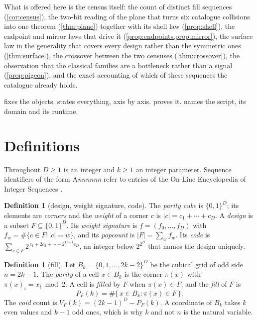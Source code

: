 \documentclass[11pt]{amsart}
\theoremstyle{definition}
\newtheorem{definition}[theorem]{Definition}
\theoremstyle{remark}
\begin{document}
What is offered here is the census itself: the count of distinct fill sequences (\cref{cor:census}), the two-bit reading of the plane that turns six catalogue collisions into one theorem (\cref{thm:plane}) together with its shell law (\cref{prop:shell}), the endpoint and mirror laws that drive it (\cref{prop:endpoints,prop:mirror}), the surface law in the generality that covers every design rather than the symmetric ones (\cref{thm:surface}), the crossover between the two censuses (\cref{thm:crossover}), the observation that the classical families are a bottleneck rather than a signal (\cref{prop:pigeon}), and the exact accounting of which of these sequences the catalogue already holds.

 fixes the objects.  states everything, axis by axis.  proves it.  names the script, its domain and its runtime.

\section{Definitions}
\label{sec:def}

Throughout $D \ge 1$ is an integer and $k \ge 1$ an integer parameter. Sequence identifiers of the form A\textit{nnnnnn} refer to entries of the On-Line Encyclopedia of Integer Sequences \cite{oeis}.

\begin{definition}[design, weight signature, code]
\label{def:design}
The \emph{parity cube} is $\{0,1\}^{D}$; its elements are \emph{corners} and the \emph{weight} of a corner $c$ is $|c| = c_{1}+\cdots+c_{D}$. A \emph{design} is a subset $F \subseteq \{0,1\}^{D}$. Its \emph{weight signature} is $f = (f_{0},\dots,f_{D})$ with $f_{w} = \#\{c \in F : |c| = w\}$, and its \emph{popcount} is $|F| = \sum_{w}f_{w}$. Its \emph{code} is $\sum_{c \in F}2^{\,c_{1}+2c_{2}+\cdots+2^{D-1}c_{D}}$, an integer below $2^{2^{D}}$ that names the design uniquely.
\end{definition}

\begin{definition}[fill]
\label{def:fill}
Let $B_{k} = \{0,1,\dots,2k-2\}^{D}$ be the cubical grid of odd side $n = 2k-1$. The \emph{parity} of a cell $x \in B_{k}$ is the corner $\pi(x)$ with $\pi(x)_{i} = x_{i} \bmod 2$. A cell is \emph{filled} by $F$ when $\pi(x) \in F$, and the \emph{fill} of $F$ is
\[
  P_{F}(k) = \#\{\,x \in B_{k} : \pi(x) \in F\,\}.
\]
The \emph{void} count is $V_{F}(k) = (2k-1)^{D} - P_{F}(k)$. A coordinate of $B_{k}$ takes $k$ even values and $k-1$ odd ones, which is why $k$ and not $n$ is the natural variable.
\end{definition}
\end{document}
